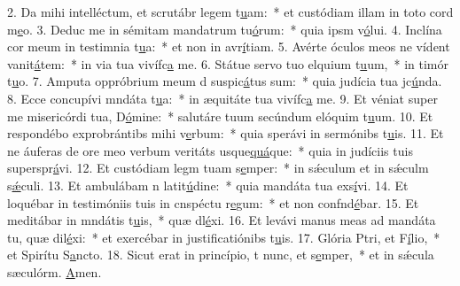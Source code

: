 2. Da mihi intelléctum, et scrutábr legem t\uline{u}am:~* et custódiam illam in toto cord m\uline{e}o.
3. Deduc me in sémitam mandatrum tu\uline{ó}rum:~* quia ipsm v\uline{ó}lui.
4. Inclína cor meum in testimnia t\uline{u}a:~* et non in avr\uline{í}tiam.
5. Avérte óculos meos ne vídent vanit\uline{á}tem:~* in via tua vivífc\uline{a} me.
6. Státue servo tuo elquium t\uline{u}um,~* in timór t\uline{u}o.
7. Amputa oppróbrium meum d suspic\uline{á}tus sum:~* quia judícia tua jc\uline{ú}nda.
8. Ecce concupívi mndáta t\uline{u}a:~* in æquitáte tua vivífc\uline{a} me.
9. Et véniat super me misericórdi tua, D\uline{ó}mine:~* salutáre tuum secúndum elóquim t\uline{u}um.
10. Et respondébo exprobrántibs mihi v\uline{e}rbum:~* quia sperávi in sermónibs t\uline{u}is.
11. Et ne áuferas de ore meo verbum veritáts usque\uline{quá}que:~* quia in judíciis tuis superspr\uline{á}vi.
12. Et custódiam legm tuam s\uline{e}mper:~* in sǽculum et in sǽculm s\uline{ǽ}culi.
13. Et ambulábam n latit\uline{ú}dine:~* quia mandáta tua exs\uline{í}vi.
14. Et loquébar in testimóniis tuis in cnspéctu r\uline{e}gum:~* et non confnd\uline{é}bar.
15. Et meditábar in mndátis t\uline{u}is,~* quæ dl\uline{é}xi.
16. Et levávi manus meas ad mandáta tu, quæ dil\uline{é}xi:~* et exercébar in justificatiónibs t\uline{u}is.
17. Glória Ptri, et F\uline{í}lio,~* et Spirítu S\uline{a}ncto.
18. Sicut erat in princípio, t nunc, et s\uline{e}mper,~* et in sǽcula sæculórm. \uline{A}men.
